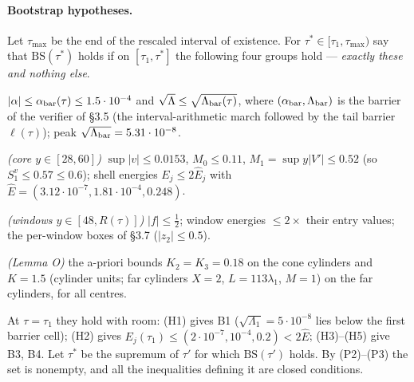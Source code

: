 \documentclass[11pt]{article}
\theoremstyle{definition}
\theoremstyle{remark}
\begin{document}
\paragraph{Bootstrap hypotheses.} Let $\tau_{\max}$ be the end of the rescaled interval of existence. For $\tau^\ast\in[\tau_1,\tau_{\max})$ say that $\mathrm{BS}(\tau^\ast)$ holds if on $[\tau_1,\tau^\ast]$ the following four groups hold --- \emph{exactly these and nothing else}.
\begin{description}[leftmargin=1.2em,labelindent=0pt]
\item[B1] $|\alpha|\le\alpha_{\rm bar}(\tau)\le1.5\cdot10^{-4}$ and $\sqrt\Lambda\le\sqrt{\Lambda_{\rm bar}(\tau)}$, where $(\alpha_{\rm bar},\Lambda_{\rm bar})$ is the barrier of the verifier of \S3.5 (the interval-arithmetic march followed by the tail barrier $\ell(\tau)$); peak $\sqrt{\Lambda_{\rm bar}}=5.31\cdot10^{-8}$.
\item[B2] \emph{(core $y\in[28,60]$)} $\sup|v|\le0.0153$, $M_0\le0.11$, $M_1=\sup y|V'|\le0.52$ (so $S_1^v\le0.57\le0.6$); shell energies $E_j\le2\hat E_j$ with $\hat E=(3.12\cdot10^{-7},1.81\cdot10^{-4},0.248)$.
\item[B3] \emph{(windows $y\in[48,R(\tau)]$)} $|f|\le\tfrac12$; window energies $\le2\times$ their entry values; the per-window boxes of \S3.7 ($|z_2|\le0.5$).
\item[B4] \emph{(Lemma O)} the a-priori bounds $K_2=K_3=0.18$ on the cone cylinders and $K=1.5$ (cylinder units; far cylinders $X=2$, $L=113\lambda_1$, $M=1$) on the far cylinders, for all centres.
\end{description}
At $\tau=\tau_1$ they hold with room: (H1) gives B1 ($\sqrt{\Lambda_1}=5\cdot10^{-8}$ lies below the first barrier cell); (H2) gives $E_j(\tau_1)\le(2\cdot10^{-7},10^{-4},0.2)<2\hat E$; (H3)--(H5) give B3, B4. Let $\tau^\ast$ be the supremum of $\tau'$ for which $\mathrm{BS}(\tau')$ holds. By (P2)--(P3) the set is nonempty, and all the inequalities defining it are closed conditions.
\end{document}
